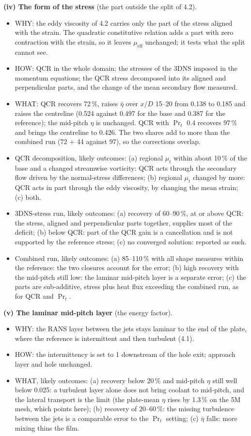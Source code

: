 \documentclass[10pt]{article}
\begin{document}
\textbf{(iv) The form of the stress} (the part outside the split of 4.2).
\begin{itemize}
\item WHY: the eddy viscosity of 4.2 carries only the part of the stress aligned with the strain. The quadratic
  constitutive relation adds a part with zero contraction with the strain, so it leaves $\mu_{\mathrm{eff}}$
  unchanged; it tests what the split cannot see.
\item HOW: QCR in the whole domain; the stresses of the 3DNS imposed in the momentum equations; the QCR stress
  decomposed into its aligned and perpendicular parts, and the change of the mean secondary flow measured.
\item WHAT: QCR recovers 72\,\%, raises $\bar\eta$ over $x/D$ 15--20 from 0.138 to 0.185 and raises the centreline
  (0.524 against 0.497 for the base and 0.387 for the reference); the mid-pitch $\eta$ is unchanged. QCR with
  $\Pr_t$ 0.4 recovers 97\,\% and brings the centreline to 0.426. The two shares add to more than the combined
  run (72 + 44 against 97), so the corrections overlap.
\item QCR decomposition, likely outcomes: (a) regional $\mu_t$ within about 10\,\% of the base and a changed
  streamwise vorticity: QCR acts through the secondary flow driven by the normal-stress differences; (b) regional
  $\mu_t$ changed by more: QCR acts in part through the eddy viscosity, by changing the mean strain; (c) both.
\item 3DNS-stress run, likely outcomes: (a) recovery of 60--90\,\%, at or above QCR: the stress, aligned and
  perpendicular parts together, supplies most of the deficit; (b) below QCR: part of the QCR gain is a
  cancellation and is not supported by the reference stress; (c) no converged solution: reported as such.
\item Combined run, likely outcomes: (a) 85--110\,\% with all shape measures within the reference: the two closures
  account for the error; (b) high recovery with the mid-pitch still low: the laminar mid-pitch layer is a
  separate error; (c) the parts are sub-additive, stress plus heat flux exceeding the combined run, as for QCR and
  $\Pr_t$.
\end{itemize}

\textbf{(v) The laminar mid-pitch layer} (the energy factor).
\begin{itemize}
\item WHY: the RANS layer between the jets stays laminar to the end of the plate, where the reference is
  intermittent and then turbulent (4.1).
\item HOW: the intermittency is set to 1 downstream of the hole exit; approach layer and hole unchanged.
\item WHAT, likely outcomes: (a) recovery below 20\,\% and mid-pitch $\eta$ still well below 0.025: a turbulent
  layer alone does not bring coolant to mid-pitch, and the lateral transport is the limit (the plate-mean $\eta$
  rises by 1.3\,\% on the 5M mesh, which points here); (b) recovery of 20--60\,\%: the missing turbulence between
  the jets is a comparable error to the $\Pr_t$ setting; (c) $\bar\eta$ falls: more mixing thins the film.
\end{itemize}
\end{document}
